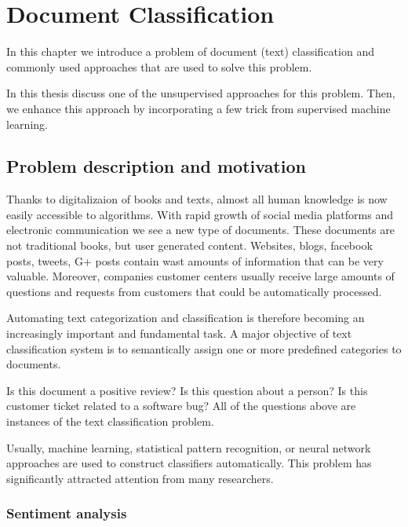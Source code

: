 \chapter{Document Classification}

    In this chapter we introduce a problem of document (text) classification and commonly used approaches that are used to solve this problem.
    
    In this thesis discuss one of the unsupervised approaches for this problem.
    Then, we enhance this approach by incorporating a few trick from supervised machine learning.

\section{Problem description and motivation} \label{sec:problem}

    Thanks to digitalizaion of books and texts, almost all human knowledge is now easily accessible to algorithms. 
    With rapid growth of social media platforms and electronic communication we see a new type of documents.
    These documents are not traditional books, but user generated content.
    Websites, blogs, facebook posts, tweets, G+ posts contain wast amounts of information that can be very valuable.
    Moreover, companies customer centers usually receive large amounts of questions and requests from customers that could be automatically processed.
    
    Automating text categorization and classification is therefore becoming an increasingly important and fundamental task. 
    A major objective of text classification system is to semantically assign one or more predefined categories to documents.
    
    Is this document a positive review? 
    Is this question about a person?
    Is this customer ticket related to a software bug?
    All of the questions above are instances of the text classification problem.
    
    Usually, machine learning, statistical pattern recognition, or neural network approaches are used to construct classifiers automatically.
    This problem has significantly attracted attention from many researchers.

    \subsection{Sentiment analysis}
    
    \* %
    
